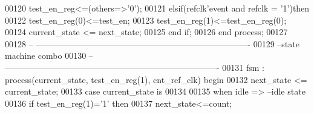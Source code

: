 \begin{DoxyCode}
00120         \textcolor{vhdlchar}{test_en_reg}\textcolor{vhdlchar}{<=}\textcolor{vhdlchar}{(}\textcolor{keywordflow}{others}\textcolor{vhdlchar}{=}\textcolor{vhdlchar}{>}\textcolor{vhdlchar}{'}\textcolor{vhdllogic}{}\textcolor{vhdllogic}{0}\textcolor{vhdlchar}{'}\textcolor{vhdlchar}{)};
00121     \textcolor{keywordflow}{elsif}\textcolor{vhdlchar}{(}\textcolor{vhdlchar}{refclk}\textcolor{vhdlchar}{'}\textcolor{vhdlkeyword}{event} \textcolor{keywordflow}{and} \textcolor{vhdlchar}{refclk} \textcolor{vhdlchar}{=} \textcolor{vhdlchar}{'}\textcolor{vhdllogic}{}\textcolor{vhdllogic}{1}\textcolor{vhdlchar}{'}\textcolor{vhdlchar}{)}\textcolor{keywordflow}{then}
00122         \textcolor{vhdlchar}{test_en_reg}\textcolor{vhdlchar}{(}\textcolor{vhdllogic}{}\textcolor{vhdllogic}{0}\textcolor{vhdlchar}{)}\textcolor{vhdlchar}{<=}\textcolor{vhdlchar}{test_en};
00123         \textcolor{vhdlchar}{test_en_reg}\textcolor{vhdlchar}{(}\textcolor{vhdllogic}{}\textcolor{vhdllogic}{1}\textcolor{vhdlchar}{)}\textcolor{vhdlchar}{<=}\textcolor{vhdlchar}{test_en_reg}\textcolor{vhdlchar}{(}\textcolor{vhdllogic}{}\textcolor{vhdllogic}{0}\textcolor{vhdlchar}{)};
00124         \textcolor{vhdlchar}{current_state} \textcolor{vhdlchar}{<=} \textcolor{vhdlchar}{next_state};
00125     \textcolor{keywordflow}{end} \textcolor{keywordflow}{if}; 
00126 \textcolor{keywordflow}{end} \textcolor{keywordflow}{process};
00127 
00128 \textcolor{keyword}{-- ----------------------------------------------------------------------------}
00129 \textcolor{keyword}{--state machine combo}
00130 \textcolor{keyword}{-- ----------------------------------------------------------------------------}
00131 fsm : \textcolor{keywordflow}{process}(current_state, test_en_reg(\textcolor{vhdllogic}{1}), cnt_ref_clk) \textcolor{keywordflow}{begin}
00132     \textcolor{vhdlchar}{next_state} \textcolor{vhdlchar}{<=} \textcolor{vhdlchar}{current_state};
00133     \textcolor{keywordflow}{case} \textcolor{vhdlchar}{current_state} \textcolor{keywordflow}{is}
00134       
00135         \textcolor{keywordflow}{when} \textcolor{vhdlchar}{idle} \textcolor{vhdlchar}{=}\textcolor{vhdlchar}{>}\textcolor{keyword}{                    --idle state}
00136             \textcolor{keywordflow}{if} \textcolor{vhdlchar}{test_en_reg}\textcolor{vhdlchar}{(}\textcolor{vhdllogic}{}\textcolor{vhdllogic}{1}\textcolor{vhdlchar}{)}\textcolor{vhdlchar}{=}\textcolor{vhdlchar}{'}\textcolor{vhdllogic}{}\textcolor{vhdllogic}{1}\textcolor{vhdlchar}{'} \textcolor{keywordflow}{then} 
00137                 \textcolor{vhdlchar}{next_state}\textcolor{vhdlchar}{<=}\textcolor{vhdlchar}{count};

\end{DoxyCode}
